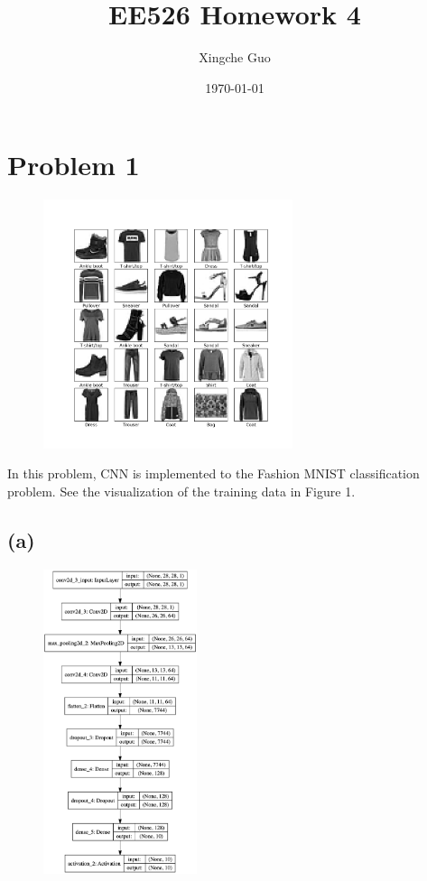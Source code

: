 \documentclass[12pt]{article}
\title{EE526 Homework 4}
\author{Xingche Guo}
\date{\today}
\begin{document}
\maketitle

\section*{Problem 1}

\begin{figure}[h] 
\includegraphics[width=0.65\textwidth]{train_examples.png}
\caption{}
\end{figure}

In this problem, CNN is implemented to the Fashion MNIST classification problem. See the visualization of the training data in Figure 1.


\subsection*{(a)}

\begin{figure}[h] 
\centering
\includegraphics[width=0.4\textwidth]{cnn_model.png}
\caption{}
\end{figure}
\end{document}
